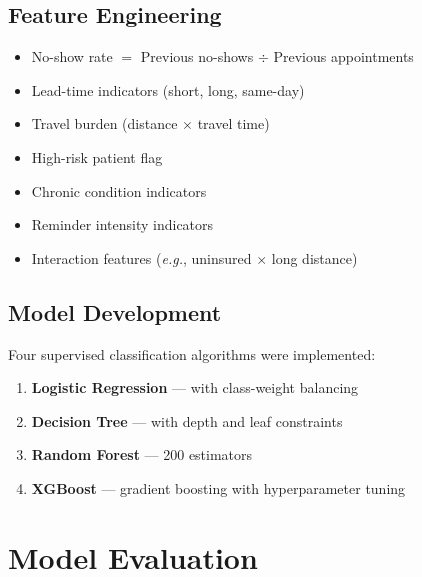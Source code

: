 \documentclass[12pt, a4paper]{report}
\begin{document}
\section{Feature Engineering}

\begin{itemize}
  \item No-show rate $=$ Previous no-shows $\div$ Previous appointments
  \item Lead-time indicators (short, long, same-day)
  \item Travel burden (distance $\times$ travel time)
  \item High-risk patient flag
  \item Chronic condition indicators
  \item Reminder intensity indicators
  \item Interaction features (\emph{e.g.}, uninsured $\times$ long distance)
\end{itemize}

\section{Model Development}

Four supervised classification algorithms were implemented:

\begin{enumerate}
  \item \textbf{Logistic Regression} --- with class-weight balancing
  \item \textbf{Decision Tree} --- with depth and leaf constraints
  \item \textbf{Random Forest} --- 200 estimators
  \item \textbf{XGBoost} --- gradient boosting with hyperparameter tuning
\end{enumerate}

\chapter{Model Evaluation}
\end{document}
